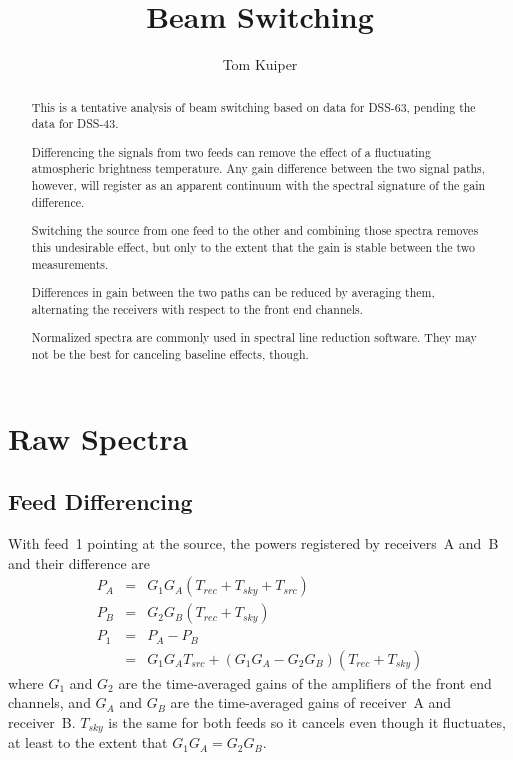\documentclass[a4paper,11pt]{article}
\title{Beam Switching}
\author{Tom Kuiper}
\begin{document}
\maketitle
\tableofcontents

\begin{abstract}
This is a tentative analysis of beam switching based on data for DSS-63, 
pending the data for DSS-43.

Differencing the signals from two feeds can remove the effect of a fluctuating 
atmospheric brightness temperature. Any gain difference between the two signal 
paths, however, will register as an apparent continuum with the spectral 
signature of the gain difference.  

Switching the source from one feed to the other and combining
those spectra removes this undesirable effect, but only to the extent that the
gain is stable between the two measurements.

Differences in gain between the two paths can be reduced by averaging them,
alternating the receivers with respect to the front end channels.

Normalized spectra are commonly used in spectral line reduction software.  They
may not be the best for canceling baseline effects, though.
\end{abstract}

\section{Raw Spectra}

\subsection{Feed Differencing}

With feed~1 pointing at the source, the powers registered by receivers~A and~B
and their difference are
\begin{eqnarray}
P_A &=& G_1 G_A ( T_{rec} + T_{sky} + T_{src} ) \nonumber \\
P_B &=& G_2 G_B ( T_{rec} + T_{sky} ) \nonumber \\
P_1 &=& P_A - P_B \nonumber \\
    &=& G_1 G_A T_{src} + (G_1 G_A - G_2 G_B)(T_{rec} + T_{sky}) \label{eqn:src-fd1}
\end{eqnarray}
where $G_1$ and $G_2$ are the time-averaged gains of the amplifiers of the
front end channels, and $G_A$ and $G_B$ are the time-averaged gains of 
receiver~A and receiver~B. $T_{sky}$ is the same for both feeds so it cancels 
even though it fluctuates, at least to the extent that $G_1 G_A = G_2 G_B$. 
 
\end{document}
